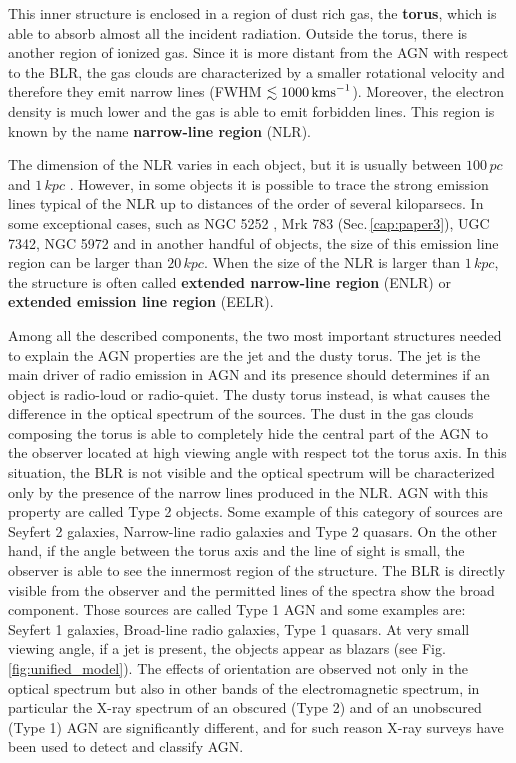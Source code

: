 \documentclass[../main.tex]{subfiles}
\begin{document}
This inner structure is enclosed in a region of dust rich gas, the \textbf{torus}, which is able to absorb almost all the incident radiation.
Outside the torus, there is another region of ionized gas.
Since it is more distant from the AGN with respect to the BLR, the gas clouds are characterized by a smaller rotational velocity and therefore they emit narrow lines (FWHM $\lesssim 1000\,\si{\kms}$).
Moreover, the electron density is much lower and the gas is able to emit forbidden lines.
This region is known by the name \textbf{narrow-line region} (NLR).

The dimension of the NLR varies in each object, but it is usually between $100\,\si{pc}$ and $1\,\si{kpc}$ \citep{Beckmann12}.
However, in some objects it is possible to trace the strong emission lines typical of the NLR up to distances of the order of several kiloparsecs.
In some exceptional cases, such as NGC 5252 \citep{Tadhunter89}, Mrk 783 (Sec.\,\ref{cap:paper3}), UGC 7342, NGC 5972 \citep{Keel12} and in another handful of objects, the size of this emission line region can be larger than $20\,\si{kpc}$.
When the size of the NLR is larger than $1\,\si{kpc}$, the structure is often called \textbf{extended narrow-line region} (ENLR) or \textbf{extended emission line region} (EELR).

Among all the described components, the two most important structures needed to explain the AGN properties are the jet and the dusty torus.
The jet is the main driver of radio emission in AGN and its presence should determines if an object is radio-loud or radio-quiet.
The dusty torus instead, is what causes the difference in the optical spectrum of the sources.
The dust in the gas clouds composing the torus is able to completely hide the central part of the AGN to the observer located at high viewing angle with respect tot the torus axis.
In this situation, the BLR is not visible and the optical spectrum will be characterized only by the presence of the narrow lines produced in the NLR.
AGN with this property are called Type 2 objects.
Some example of this category of sources are Seyfert 2 galaxies, Narrow-line radio galaxies and Type 2 quasars.
On the other hand, if the angle between the torus axis and the line of sight is small, the observer is able to see the innermost region of the structure.
The BLR is directly visible from the observer and the permitted lines of the spectra show the broad component.
Those sources are called Type 1 AGN and some examples are: Seyfert 1 galaxies, Broad-line radio galaxies, Type 1 quasars.
At very small viewing angle, if a jet is present, the objects appear as blazars (see Fig.\,\ref{fig:unified_model}).
The effects of orientation are observed not only in the optical spectrum but also in other bands of the electromagnetic spectrum, in particular the X-ray spectrum of an obscured (Type 2) and of an unobscured (Type 1) AGN are significantly different, and for such reason X-ray surveys have been used to detect and classify AGN. 
\end{document}
